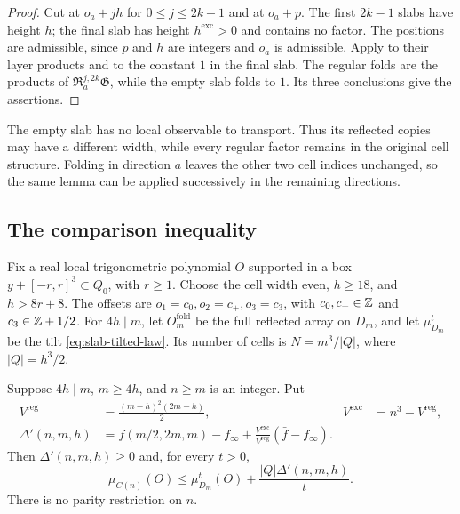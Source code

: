 \begin{proof}
Cut at $o_a+jh$ for $0\le j\le2k-1$ and at $o_a+p$.
The first $2k-1$ slabs have height $h$; the final slab has height
$h^{\mathrm{exc}}>0$ and contains no factor. The positions are
admissible, since $p$ and $h$ are integers and $o_a$ is admissible.
Apply  to their layer products
and to the constant $1$ in the final slab. The regular folds are
the products of $\mathfrak R_a^{j,2k}\mathfrak G$, while the empty
slab folds to $1$. Its three conclusions give the assertions.
\end{proof}

The empty slab has no local observable to transport. Thus its reflected
copies may have a different width, while every regular factor remains
in the original cell structure. Folding in direction $a$ leaves the
other two cell indices unchanged, so the same lemma can be applied
successively in the remaining directions.

\subsection{The comparison inequality}

Fix a real local trigonometric polynomial $O$ supported in a box
$y+[-r,r]^3\subset Q_0$, with $r\ge1$. Choose the cell width even,
$h\ge18$, and $h>8r+8$. The offsets are
$o_1=c_0,o_2=c_+,o_3=c_3$, with $c_0,c_+\in\mathbb Z$ and
$c_3\in\mathbb Z+1/2$. For $4h\mid m$, let $O_m^{\mathrm{fold}}$ be
the full reflected array on $D_m$, and let $\mu_{D_m}^t$ be the
tilt \eqref{eq:slab-tilted-law}. Its number of cells is
$N=m^3/|Q|$, where $|Q|=h^3/2$.

\begin{proposition}\label{prop:fold-any-side}
Suppose $4h\mid m$, $m\ge4h$, and $n\ge m$ is an integer.
Put
\begin{align*}
 V^{\mathrm{reg}}&=\frac{(m-h)^2(2m-h)}2,
 &V^{\mathrm{exc}}&=n^3-V^{\mathrm{reg}},\\
 \Delta'(n,m,h)&=f(m/2,2m,m)-f_\infty
       +\frac{V^{\mathrm{exc}}}{V^{\mathrm{reg}}}
                     (\bar f-f_\infty).
\end{align*}
Then $\Delta'(n,m,h)\ge0$ and, for every $t>0$,
\begin{equation}\label{eq:sides-expectation-comparison}
 \mu_{C(n)}(O)\le\mu_{D_m}^t(O)
                   +\frac{|Q|\Delta'(n,m,h)}t.
\end{equation}
There is no parity restriction on $n$.
\end{proposition}

